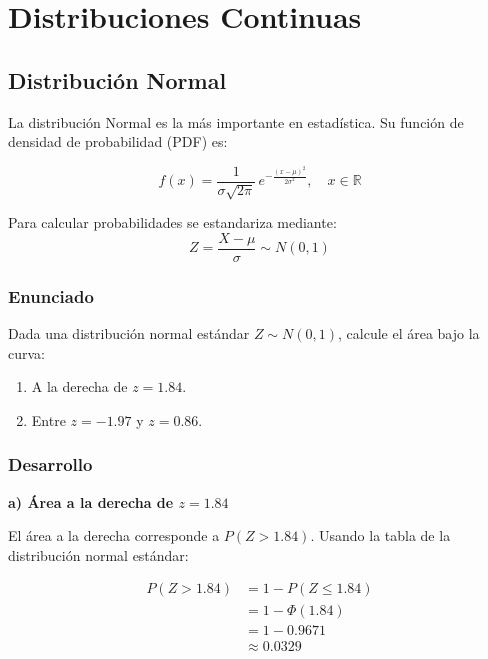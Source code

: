 \documentclass[12pt,a4paper]{article}
\begin{document}
\section{Distribuciones Continuas}
 
\subsection{Distribución Normal}
 
La distribución Normal es la más importante en estadística. Su función de densidad
de probabilidad (PDF) es:
 
\begin{equation}
    f(x) = \frac{1}{\sigma\sqrt{2\pi}} \, e^{-\frac{(x-\mu)^2}{2\sigma^2}},
    \quad x \in \mathbb{R}
\end{equation}
 
Para calcular probabilidades se estandariza mediante:
\begin{equation}
    Z = \frac{X - \mu}{\sigma} \sim N(0, 1)
\end{equation}
 
\subsubsection*{Enunciado}
 
Dada una distribución normal estándar $Z \sim N(0,1)$, calcule el área bajo la curva:
 
\begin{enumerate}[label=\alph*)]
    \item A la derecha de $z = 1.84$.
    \item Entre $z = -1.97$ y $z = 0.86$.
\end{enumerate}
 
\subsubsection*{Desarrollo}
 
\textbf{a) Área a la derecha de $z = 1.84$}
 
El área a la derecha corresponde a $P(Z > 1.84)$. Usando la tabla de la distribución
normal estándar:
 
\begin{align}
    P(Z > 1.84) &= 1 - P(Z \leq 1.84) \\
                &= 1 - \Phi(1.84) \\
                &= 1 - 0.9671 \\
                &\approx \boxed{0.0329}
\end{align}
 
\end{document}
